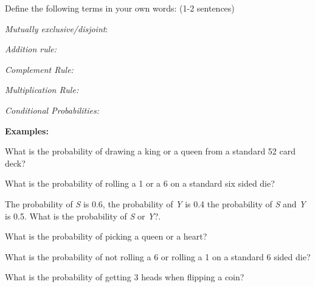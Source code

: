 \begin{problem}
  \item Define the following terms in your own words: (1-2 sentences) 

    \begin{subproblem}
      \item \textit{Mutually exclusive/disjoint}: 
      \item \textit{Addition rule:} 
      \item \textit{Complement Rule:} 
      \item \textit{Multiplication Rule:} 
      \item \textit{Conditional Probabilities:}  
    \end{subproblem}

  \item \textbf{Examples:}

  \begin{subproblem}

  \item What is the probability of drawing a king or a queen from a
    standard 52 card deck?

    \vspace{2em}

  \item What is the probability of rolling a 1 or a 6 on a standard
    six sided die?  

    \vspace{2em}

  \item The probability of \textit{S} is 0.6, the probability of
    \textit{Y} is 0.4 the probability of \textit{S} and \textit{Y} is
    0.5. What is the probability of \textit{S} or \textit{Y}?.

    \vspace{2em}

  \item What is the probability of picking a queen or a heart?

    \vspace{2em}

  \item What is the probability of not rolling a 6 or rolling a 1 on a
    standard 6 sided die?

    \vspace{2em}

  \item What is the probability of getting 3 heads when flipping a
    coin?

    \vspace{2em}


\end{subproblem}
\end{problem}

